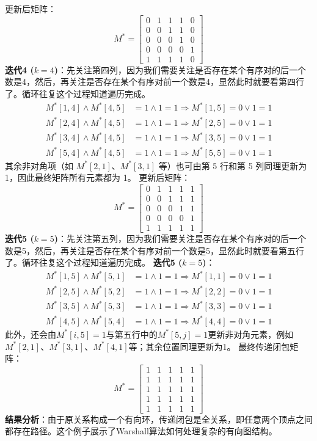 更新后矩阵：
\[
M^* = \begin{bmatrix}
0 & 1 & 1 & 1 & 0 \\
0 & 0 & 1 & 1 & 0 \\
0 & 0 & 0 & 1 & 0 \\
0 & 0 & 0 & 0 & 1 \\
1 & 1 & 1 & 1 & 0
\end{bmatrix}
\]
\textbf{迭代4 ($k=4$)}：先关注第四列，因为我们需要关注是否存在某个有序对的后一个数是4，然后，再关注是否存在某个有序对前一个数是4，显然此时就要看第四行了。循环往复这个过程知道遍历完成。
\begin{align*}
M^*[1,4] \land M^*[4,5] &= 1 \land 1 = 1 \Rightarrow M^*[1,5] = 0 \lor 1 = 1 \\
M^*[2,4] \land M^*[4,5] &= 1 \land 1 = 1 \Rightarrow M^*[2,5] = 0 \lor 1 = 1 \\
M^*[3,4] \land M^*[4,5] &= 1 \land 1 = 1 \Rightarrow M^*[3,5] = 0 \lor 1 = 1 \\
M^*[5,4] \land M^*[4,5] &= 1 \land 1 = 1 \Rightarrow M^*[5,5] = 0 \lor 1 = 1
\end{align*}
其余非对角项（如 $M^*[2,1]$、$M^*[3,1]$ 等）也可由第 5 行和第 5 列同理更新为 1，因此最终矩阵所有元素都为 1。
更新后矩阵：
\[
M^* = \begin{bmatrix}
0 & 1 & 1 & 1 & 1 \\
0 & 0 & 1 & 1 & 1 \\
0 & 0 & 0 & 1 & 1 \\
0 & 0 & 0 & 0 & 1 \\
1 & 1 & 1 & 1 & 1
\end{bmatrix}
\]
\textbf{迭代5 ($k=5$)}：先关注第五列，因为我们需要关注是否存在某个有序对的后一个数是5，然后，再关注是否存在某个有序对前一个数是5，显然此时就要看第五行了。循环往复这个过程知道遍历完成。
\textbf{迭代5 ($k=5$)}：
\begin{align*}
M^*[1,5] \land M^*[5,1] &= 1 \land 1 = 1 \Rightarrow M^*[1,1] = 0 \lor 1 = 1 \\
M^*[2,5] \land M^*[5,2] &= 1 \land 1 = 1 \Rightarrow M^*[2,2] = 0 \lor 1 = 1 \\
M^*[3,5] \land M^*[5,3] &= 1 \land 1 = 1 \Rightarrow M^*[3,3] = 0 \lor 1 = 1 \\
M^*[4,5] \land M^*[5,4] &= 1 \land 1 = 1 \Rightarrow M^*[4,4] = 0 \lor 1 = 1
\end{align*}
此外，还会由$M^*[i,5]=1$与第五行中的$M^*[5,j]=1$更新非对角元素，例如$M^*[2,1]$、$M^*[3,1]$、$M^*[4,1]$等；其余位置同理更新为1。
最终传递闭包矩阵：
\[
M^* = \begin{bmatrix}
1 & 1 & 1 & 1 & 1 \\
1 & 1 & 1 & 1 & 1 \\
1 & 1 & 1 & 1 & 1 \\
1 & 1 & 1 & 1 & 1 \\
1 & 1 & 1 & 1 & 1
\end{bmatrix}
\]
\textbf{结果分析}：由于原关系构成一个有向环，传递闭包是全关系，即任意两个顶点之间都存在路径。这个例子展示了Warshall算法如何处理复杂的有向图结构。
